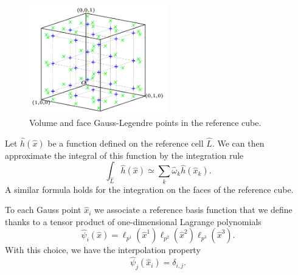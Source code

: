 \documentclass[12pt]{amsart}
\begin{document}
\begin{figure}[h]
  \centering
  \includegraphics[width=6cm]{ref_element_pg}
  \caption{Volume and face Gauss-Legendre points in the reference cube.\label{fig:cube-pg}}
\end{figure}

Let $\hat h(\hat x)$ be a function defined on the reference cell $\hat L$. We can then approximate the integral of this function by the integration rule
\begin{equation}\label{eq:quadrule}
\int_{\hat L} \hat h(\hat x) \simeq \sum_k \hat \omega_k \hat h(\hat x_k).
\end{equation}
A similar formula holds for the integration on the faces of the reference cube.

To each Gauss point $\hat x _i$ we associate a reference basis function that we define thanks to a tensor product of one-dimensional Lagrange polynomials
$$\hat \psi_i(\hat x)=\ell_{p^1}(\hat x^1)\ell_{p^2}(\hat x^2)\ell_{p^3}(\hat x^3).$$With this choice, we have the interpolation property
$$\hat \psi_j(\hat x_i)=\delta_{i,j}.$$
\end{document}
